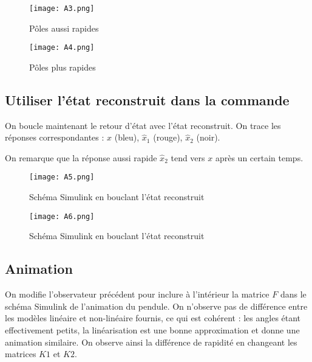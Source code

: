 \documentclass{report}
\begin{document}
\begin{figure}[h!]
    \centering
    \texttt{[image: A3.png]} %
    \caption{Pôles aussi rapides}
    \label{fig:A3}
\end{figure}

\begin{figure}[h!]
    \centering
    \texttt{[image: A4.png]} %
    \caption{Pôles plus rapides}
    \label{fig:A4}
\end{figure}
\vspace{4cm}
\subsection{Utiliser l'état reconstruit dans la commande}

On boucle maintenant le retour d'état avec l'état reconstruit. On trace les réponses correspondantes : \( x \) (bleu), \( \hat{x}_{1} \) (rouge), \( \hat{x}_{2} \) (noir).

On remarque que la réponse aussi rapide \( \hat{x}_{2} \) tend vers \( x \) après un certain temps.

\begin{figure}[h!]
    \centering
    \texttt{[image: A5.png]} %
    \caption{Schéma Simulink en bouclant l'état reconstruit}
    \label{fig:A5}
\end{figure}

\begin{figure}[h!]
    \centering
    \texttt{[image: A6.png]} %
    \caption{Schéma Simulink en bouclant l'état reconstruit}
    \label{fig:A6}
\end{figure}

\subsection{Animation}

On modifie l'observateur précédent pour inclure à l'intérieur la matrice \( F \) dans le schéma Simulink de l'animation du pendule. On n'observe pas de différence entre les modèles linéaire et non-linéaire fournis, ce qui est cohérent : les angles étant effectivement petits, la linéarisation est une bonne approximation et donne une animation similaire. On observe ainsi la différence de rapidité en changeant les matrices \( K1 \) et \( K2 \).
\end{document}
